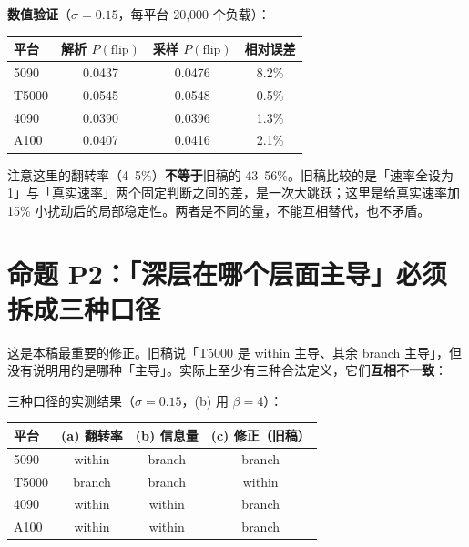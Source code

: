 \documentclass[12pt]{ctexart}
\newcommand{\flip}{\mathrm{flip}}
\begin{document}
\textbf{数值验证}（$\sigma=0.15$，每平台 20,000 个负载）：

\begin{table}[htbp]
\centering\small
\begin{tabular}{@{}lccc@{}}
\toprule
平台 & 解析 $P(\flip)$ & 采样 $P(\flip)$ & 相对误差 \\
\midrule
5090  & 0.0437 & 0.0476 & 8.2\% \\
T5000 & 0.0545 & 0.0548 & 0.5\% \\
4090  & 0.0390 & 0.0396 & 1.3\% \\
A100  & 0.0407 & 0.0416 & 2.1\% \\
\bottomrule
\end{tabular}
\end{table}

注意这里的翻转率（4--5\%）\textbf{不等于}旧稿的 43--56\%。旧稿比较的是「速率全设为 1」与「真实速率」两个固定判断之间的差，是一次大跳跃；这里是给真实速率加 15\% 小扰动后的局部稳定性。两者是不同的量，不能互相替代，也不矛盾。

\section{命题 P2：「深层在哪个层面主导」必须拆成三种口径}
\label{sec:three}

这是本稿最重要的修正。旧稿说「T5000 是 within 主导、其余 branch 主导」，但没有说明用的是哪种「主导」。实际上至少有三种合法定义，它们\textbf{互相不一致}：

\begin{table}[htbp]
\centering\small
{}
\end{table}

三种口径的实测结果（$\sigma=0.15$，(b) 用 $\beta=4$）：

\begin{table}[htbp]
\centering\small
\begin{tabular}{@{}lccc@{}}
\toprule
平台 & (a) 翻转率 & (b) 信息量 & (c) 修正（旧稿） \\
\midrule
5090  & within & branch & branch \\
T5000 & branch & branch & within \\
4090  & within & within & branch \\
A100  & within & within & branch \\
\bottomrule
\end{tabular}
\end{table}
\end{document}
